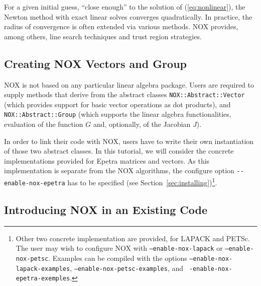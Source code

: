 For a given initial guess, ``close enough'' to the solution of
(\ref{eq:nonlinear}), the Newton method with exact linear solves
converges quadratically. In practice, the radius of convergence is often
extended via various methods. NOX provides, among others, line search
techniques and trust region strategies.


\subsection{Creating NOX Vectors and Group}
\label{sec:nox_intro}

NOX is not based on any particular linear algebra package. Users are
required to supply methods that derive from the abstract classes
\verb!NOX::Abstract::Vector! (which provides support for basic vector
operations as dot products), and \verb!NOX::Abstract::Group!  (which
supports the linear algebra functionalities, evaluation of the function
$G$ and, optionally, of the Jacobian $J$).

In order to link their code with NOX, users have to write their own
instantiation of those two abstract classes. In this tutorial, we will
consider the concrete implementations provided for Epetra matrices and
vectors. As this implementation is separate from the NOX algorithms, the
configure option \verb!--enable-nox-epetra! has to be specified (see
Section~\ref{sec:installing})\footnote{Other two concrete implementation
  are provided, for LAPACK and PETSc. The user may wish to configure NOX
  with {\tt --enable-nox-lapack} or {\tt --enable-nox-petsc}. Examples
  can be compiled with the options {\tt --enable-nox-lapack-examples},
  {\tt --enable-nox-petsc-examples}, and {\tt
    -enable-nox-epetra-exemples}.}.


\subsection{Introducing NOX in an Existing Code}
\label{sec:nox_introduce}

